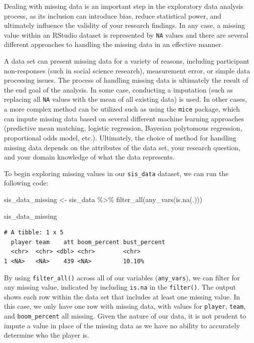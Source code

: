\documentclass[
  letterpaper,
]{krantz}
\newenvironment{Shaded}{\begin{snugshade}}{\end{snugshade}}
\newcommand{\FunctionTok}[1]{\textcolor[rgb]{0.28,0.35,0.67}{#1}}
\newcommand{\NormalTok}[1]{\textcolor[rgb]{0.00,0.23,0.31}{#1}}
\newcommand{\OtherTok}[1]{\textcolor[rgb]{0.00,0.23,0.31}{#1}}
\newcommand{\SpecialCharTok}[1]{\textcolor[rgb]{0.37,0.37,0.37}{#1}}
\begin{document}
Dealing with missing data is an important step in the exploratory data
analysis process, as its inclusion can introduce bias, reduce
statistical power, and ultimately influence the validity of your
research findings. In any case, a missing value within an RStudio
dataset is represented by \texttt{NA} values and there are several
different approaches to handling the missing data in an effective
manner.

A data set can present missing data for a variety of reasons, including
participant non-responses (such in social science research), measurement
error, or simple data processing issues. The process of handling missing
data is ultimately the result of the end goal of the analysis. In some
case, conducting a imputation (such as replacing all \texttt{NA} values
with the mean of all existing data) is used. In other cases, a more
complex method can be utilized such as using the \texttt{mice} package,
which can impute missing data based on several different machine
learning approaches (predictive mean matching, logistic regression,
Bayesian polytomous regression, proportional odds model, etc.).
Ultimately, the choice of method for handling missing data depends on
the attributes of the data set, your research question, and your domain
knowledge of what the data represents.

To begin exploring missing values in our \texttt{sis\_data} dataset, we
can run the following code:

\begin{Shaded}
\begin{Highlighting}[]
\NormalTok{sis\_data\_missing }\OtherTok{\textless{}{-}}\NormalTok{ sis\_data }\SpecialCharTok{\%\textgreater{}\%}
  \FunctionTok{filter\_all}\NormalTok{(}\FunctionTok{any\_vars}\NormalTok{(}\FunctionTok{is.na}\NormalTok{(.)))}

\NormalTok{sis\_data\_missing}
\end{Highlighting}
\end{Shaded}

\begin{verbatim}
# A tibble: 1 x 5
  player team    att boom_percent bust_percent
  <chr>  <chr> <dbl> <chr>        <chr>       
1 <NA>   <NA>    439 <NA>         10.10%      
\end{verbatim}

By using \texttt{filter\_all()} across all of our variables
(\texttt{any\_vars}), we can filter for any missing value, indicated by
including \texttt{is.na} in the \texttt{filter()}. The output shows each
row within the data set that includes at least one missing value. In
this case, we only have one row with missing data, with values for
\texttt{player}, \texttt{team}, and \texttt{boom\_percent} all missing.
Given the nature of our data, it is not prudent to impute a value in
place of the missing data as we have no ability to accurately determine
who the player is.
\end{document}
